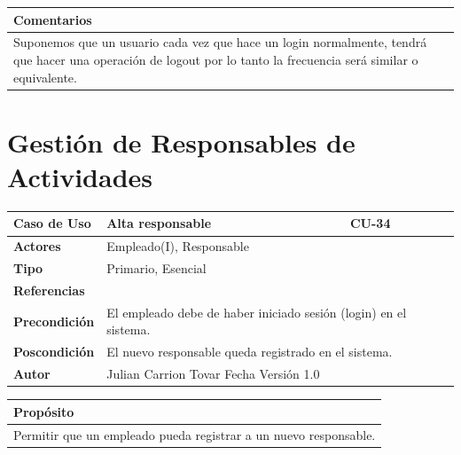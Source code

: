 \vspace{0.2cm}

\begin{table}[h!]
\centering
\begin{tabularx}{\textwidth}{|X|}
\hline
\cellcolor[HTML]{F2F2F2}\textbf{Comentarios} \\ \hline
Suponemos que un usuario cada vez que hace un login normalmente, tendrá que hacer una operación de logout por lo tanto la frecuencia será similar o equivalente. \\ \hline
\end{tabularx}
\end{table}




\clearpage
\chapter{Gestión de Responsables de Actividades}

\begin{table}[h!]
\centering
\begin{tabularx}{\textwidth}{|l|X|X|}
\hline
\textbf{Caso de Uso} & Alta responsable & CU-34 \\ \hline
\textbf{Actores} & \multicolumn{2}{l|}{Empleado(I), Responsable} \\ \hline
\textbf{Tipo} & \multicolumn{2}{l|}{Primario, Esencial} \\ \hline
\textbf{Referencias} & \multicolumn{2}{l|}{} \\ \hline
\textbf{Precondición} & \multicolumn{2}{l|}{El empleado debe de haber iniciado sesión (login) en el sistema.} \\ \hline
\textbf{Poscondición} & \multicolumn{2}{l|}{El nuevo responsable queda registrado en el sistema.} \\ \hline
\textbf{Autor} & \multicolumn{2}{l|}{Julian Carrion Tovar \hfill Fecha \hfill Versión 1.0} \\ \hline
\end{tabularx}
\end{table}

\vspace{0.2cm}

\begin{table}[h!]
\centering
\begin{tabularx}{\textwidth}{|X|}
\hline
\cellcolor[HTML]{F2F2F2}\textbf{Propósito} \\ \hline
Permitir que un empleado pueda registrar a un nuevo responsable. \\ \hline
\end{tabularx}
\end{table}

